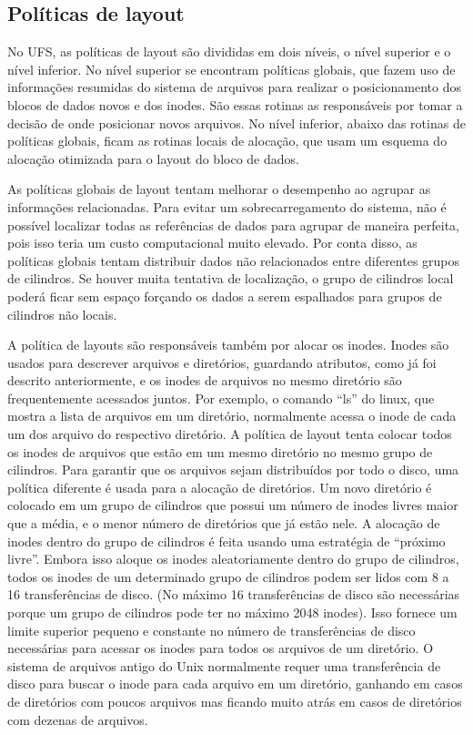 \subsection{Políticas de layout}

No UFS, as políticas de layout são divididas em dois níveis, o nível superior e o nível inferior. No nível superior se encontram políticas globais, que fazem uso de informações resumidas do sistema de arquivos para realizar o posicionamento dos blocos de dados novos e dos inodes. São essas rotinas as responsáveis por tomar a decisão de onde posicionar novos arquivos. No nível inferior, abaixo das rotinas de políticas globais, ficam as rotinas locais de alocação, que usam um esquema do alocação otimizada para o layout do bloco de dados.

As políticas globais de layout tentam melhorar o desempenho ao agrupar as informações relacionadas. Para evitar um sobrecarregamento do sistema, não é possível localizar todas as referências de dados para agrupar de maneira perfeita, pois isso teria um custo computacional muito elevado. Por conta disso, as políticas globais tentam distribuir dados não relacionados entre diferentes grupos de cilindros. Se houver muita tentativa de localização, o grupo de cilindros local poderá ficar sem espaço forçando os dados a serem espalhados para grupos de cilindros não locais.

A política de layouts são responsáveis também por alocar os inodes. Inodes são usados para descrever arquivos e diretórios, guardando atributos, como já foi descrito anteriormente, e os inodes de arquivos no mesmo diretório são frequentemente acessados juntos. Por exemplo, o comando ``ls'' do linux, que mostra a lista de arquivos em um diretório, normalmente acessa o inode de cada um dos arquivo do respectivo diretório. A política de layout tenta colocar todos os inodes de arquivos que estão em um mesmo diretório no mesmo grupo de cilindros. Para garantir que os arquivos sejam distribuídos por todo o disco, uma política diferente é usada para a alocação de diretórios. Um novo diretório é colocado em um grupo de cilindros que possui um número de inodes livres maior que a média, e o menor número de diretórios que já estão nele. A alocação de inodes dentro do grupo de cilindros é feita usando uma estratégia de ``próximo livre''. Embora isso aloque os inodes aleatoriamente dentro do grupo de cilindros, todos os inodes de um determinado grupo de cilindros podem ser lidos com 8 a 16 transferências de disco. (No máximo 16 transferências de disco são necessárias porque um grupo de cilindros pode ter no máximo 2048 inodes). Isso fornece um limite superior pequeno e constante no número de transferências de disco necessárias para acessar os inodes para todos os arquivos de um diretório. O sistema de arquivos antigo do Unix normalmente requer uma transferência de disco para buscar o inode para cada arquivo em um diretório, ganhando em casos de diretórios com poucos arquivos mas ficando muito atrás em casos de diretórios com dezenas de arquivos.

